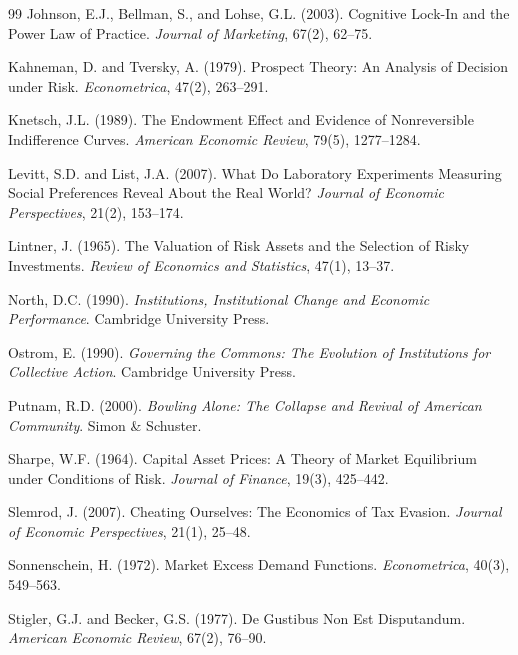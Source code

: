 \documentclass[12pt,a4paper]{article}
\begin{document}
\begin{thebibliography}{99}
Johnson, E.J., Bellman, S., and Lohse, G.L. (2003).
Cognitive Lock-In and the Power Law of Practice.
\emph{Journal of Marketing}, 67(2), 62–75.

Kahneman, D. and Tversky, A. (1979).
Prospect Theory: An Analysis of Decision under Risk.
\emph{Econometrica}, 47(2), 263–291.

Knetsch, J.L. (1989).
The Endowment Effect and Evidence of Nonreversible Indifference Curves.
\emph{American Economic Review}, 79(5), 1277–1284.

Levitt, S.D. and List, J.A. (2007).
What Do Laboratory Experiments Measuring Social Preferences Reveal About the Real World?
\emph{Journal of Economic Perspectives}, 21(2), 153–174.

Lintner, J. (1965).
The Valuation of Risk Assets and the Selection of Risky Investments.
\emph{Review of Economics and Statistics}, 47(1), 13–37.

North, D.C. (1990).
\emph{Institutions, Institutional Change and Economic Performance}.
Cambridge University Press.

Ostrom, E. (1990).
\emph{Governing the Commons: The Evolution of Institutions for Collective Action}.
Cambridge University Press.

Putnam, R.D. (2000).
\emph{Bowling Alone: The Collapse and Revival of American Community}.
Simon \& Schuster.

Sharpe, W.F. (1964).
Capital Asset Prices: A Theory of Market Equilibrium under Conditions of Risk.
\emph{Journal of Finance}, 19(3), 425–442.

Slemrod, J. (2007).
Cheating Ourselves: The Economics of Tax Evasion.
\emph{Journal of Economic Perspectives}, 21(1), 25–48.

Sonnenschein, H. (1972).
Market Excess Demand Functions.
\emph{Econometrica}, 40(3), 549–563.

Stigler, G.J. and Becker, G.S. (1977).
De Gustibus Non Est Disputandum.
\emph{American Economic Review}, 67(2), 76–90.



\end{thebibliography}
\end{document}
